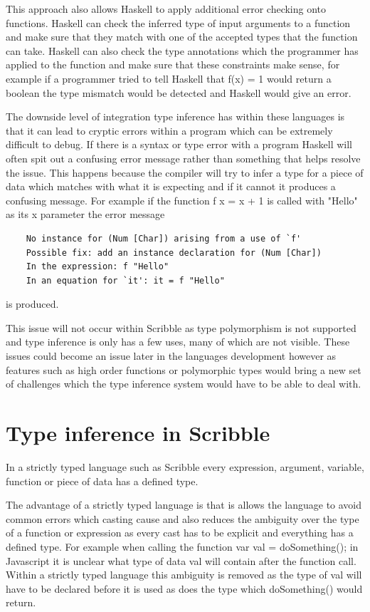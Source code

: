 \documentclass[]{final_report}
\begin{document}
This approach also allows Haskell to apply additional error checking onto functions. Haskell can check the inferred type of input arguments to a function and make sure that they match with one of the accepted types that the function can take. Haskell can also check the type annotations which the programmer has applied to the function and make sure that these constraints make sense, for example if a programmer tried to tell Haskell that f(x) = 1 would return a boolean the type mismatch would be detected and Haskell would give an error.

The downside level of integration type inference has within these languages is that it can lead to cryptic errors within a program which can be extremely difficult to debug. If there is a syntax or type error with a program Haskell will often spit out a confusing error message rather than something that helps resolve the issue. This happens because the compiler will try to infer a type for a piece of data which matches with what it is expecting and if it cannot it produces a confusing message. For example if the function f x = x + 1 is called with "Hello" as its x parameter the error message
\begin{verbatim}
    No instance for (Num [Char]) arising from a use of `f'
    Possible fix: add an instance declaration for (Num [Char])
    In the expression: f "Hello"
    In an equation for `it': it = f "Hello"
\end{verbatim}
is produced. 

This issue will not occur within Scribble as type polymorphism is not supported and type inference is only has a few uses, many of which are not visible. These issues could become an issue later in the languages development however as features such as high order functions or polymorphic types would bring a new set of challenges which the type inference system would have to be able to deal with.

\section{Type inference in Scribble}

In a strictly typed language such as Scribble every expression, argument, variable, function or piece of data has a defined type.

The advantage of a strictly typed language is that is allows the language to avoid common errors which casting cause and also reduces the ambiguity over the type of a function or expression as every cast has to be explicit and everything has a defined type. For example when calling the function var val = doSomething(); in Javascript it is unclear what type of data val will contain after the function call. Within a strictly typed language this ambiguity is removed as the type of val will have to be declared before it is used as does the type which doSomething() would return.
\end{document}
